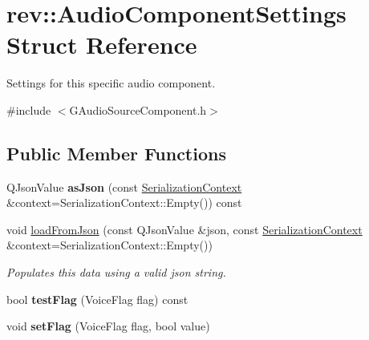 \hypertarget{structrev_1_1_audio_component_settings}{}\section{rev\+::Audio\+Component\+Settings Struct Reference}
\label{structrev_1_1_audio_component_settings}


Settings for this specific audio component.  




{\ttfamily \#include $<$G\+Audio\+Source\+Component.\+h$>$}

\subsection*{Public Member Functions}
\begin{DoxyCompactItemize}
\item 
\mbox{\label{structrev_1_1_audio_component_settings_a96021f1b0b236560081652098860c854}} 
Q\+Json\+Value {\bfseries as\+Json} (const \mbox{\hyperlink{structrev_1_1_serialization_context}{Serialization\+Context}} \&context=Serialization\+Context\+::\+Empty()) const
\item 
\mbox{\label{structrev_1_1_audio_component_settings_a1fc9e0426b9e0c78ed2684889acc03f1}} 
void \mbox{\hyperlink{structrev_1_1_audio_component_settings_a1fc9e0426b9e0c78ed2684889acc03f1}{load\+From\+Json}} (const Q\+Json\+Value \&json, const \mbox{\hyperlink{structrev_1_1_serialization_context}{Serialization\+Context}} \&context=Serialization\+Context\+::\+Empty())
\begin{DoxyCompactList}\small\item\em Populates this data using a valid json string. \end{DoxyCompactList}\item 
\mbox{\label{structrev_1_1_audio_component_settings_a7b571af9c2b6d5a371ba1ac7e26df6c2}} 
bool {\bfseries test\+Flag} (Voice\+Flag flag) const
\item 
\mbox{\label{structrev_1_1_audio_component_settings_a42be5431b58dfd1441f1a48678cf7c2e}} 
void {\bfseries set\+Flag} (Voice\+Flag flag, bool value)
\end{DoxyCompactItemize}
